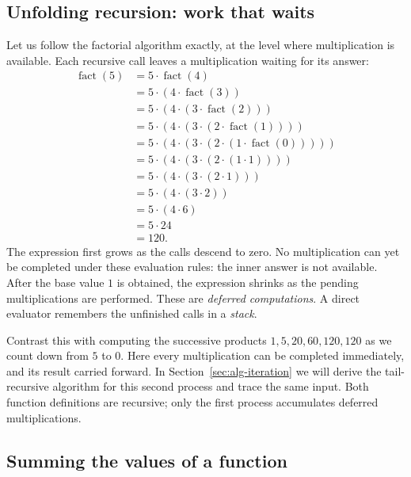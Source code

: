 \subsection{Unfolding recursion: work that waits}
\label{sec:alg-deferred}

Let us follow the factorial algorithm exactly, at the level where
multiplication is available. Each recursive call leaves a multiplication
waiting for its answer:
\[
\begin{aligned}
\operatorname{fact}(5)
 &=5\cdot\operatorname{fact}(4)\\
 &=5\cdot(4\cdot\operatorname{fact}(3))\\
 &=5\cdot(4\cdot(3\cdot\operatorname{fact}(2)))\\
 &=5\cdot(4\cdot(3\cdot(2\cdot\operatorname{fact}(1))))\\
 &=5\cdot(4\cdot(3\cdot(2\cdot(1\cdot\operatorname{fact}(0)))))\\
 &=5\cdot(4\cdot(3\cdot(2\cdot(1\cdot1))))\\
 &=5\cdot(4\cdot(3\cdot(2\cdot1)))\\
 &=5\cdot(4\cdot(3\cdot2))\\
 &=5\cdot(4\cdot6)\\
 &=5\cdot24\\
 &=120.
\end{aligned}
\]
The expression first grows as the calls descend to zero. No multiplication
can yet be completed under these evaluation rules: the inner answer is not
available. After the base value $1$ is obtained, the expression shrinks as
the pending multiplications are performed. These are \emph{deferred
computations}. A direct evaluator remembers the unfinished calls in a
\emph{stack}.

Contrast this with computing the successive products $1,5,20,60,120,120$
as we count down from $5$ to $0$. Here every multiplication can be completed
immediately, and its result carried forward. In
Section~\ref{sec:alg-iteration} we will derive the tail-recursive algorithm
for this second process and trace the same input. Both function definitions
are recursive; only the first process accumulates deferred multiplications.

\subsection{Summing the values of a function}
\label{sec:alg-sum}

